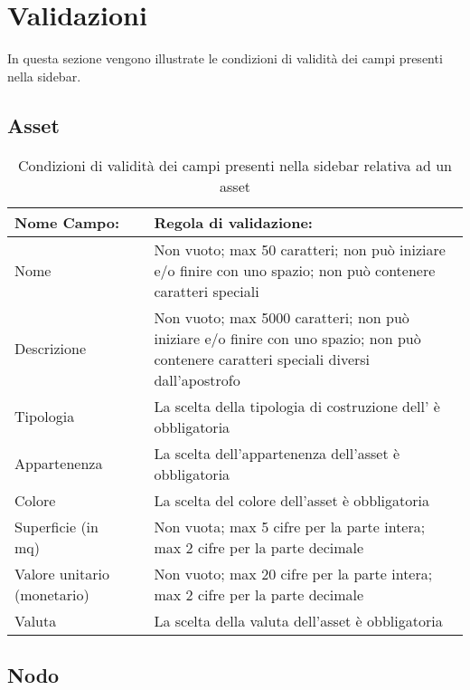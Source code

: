 \section{Validazioni}
	\label{Validazioni}
	In questa sezione vengono illustrate le condizioni di validità dei campi presenti nella sidebar.
\subsection{Asset}
	
	\begin{table}[H]
		\centering
		\begin{tabular}{ p{3cm}p{0cm}p{10.5cm}}
			\toprule
			\textbf{Nome Campo:} & & \textbf{Regola di validazione:} \\
			\midrule
			{Nome} & & Non vuoto; max 50 caratteri; non può iniziare e/o finire con uno spazio; non può contenere caratteri speciali
			\\ \hline
			{Descrizione} & & {Non vuoto; max 5000 caratteri; non può iniziare e/o finire con uno spazio; non può contenere caratteri speciali diversi dall'apostrofo} \\ \hline
			{Tipologia} & &{La scelta della tipologia di costruzione dell'\mglo{Asset}{asset} è obbligatoria} \\ \hline
			{Appartenenza} & &{La scelta dell'appartenenza dell'asset è obbligatoria} \\ \hline
			{Colore} & &{La scelta del colore dell'asset è obbligatoria} \\ \hline
			{Superficie (in mq)} & &{Non vuota; max 5 cifre per la parte intera; max 2 cifre per la parte decimale} \\ \hline
			{Valore unitario (monetario)} & &{Non vuoto; max 20 cifre per la parte intera; max 2 cifre per la parte decimale} \\ \hline
			{Valuta} & &{La scelta della valuta dell'asset è obbligatoria} \\ \hline
		\end{tabular}
		\caption{Condizioni di validità dei campi presenti nella sidebar relativa ad un asset }
	\end{table}

\subsection{Nodo}
	
